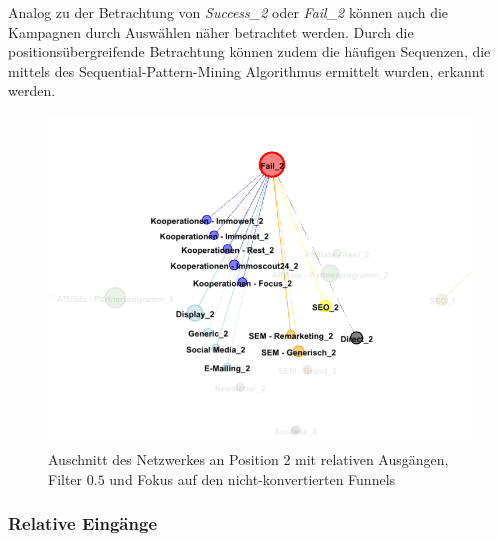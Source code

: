 Analog zu der Betrachtung von \textit{Success\_2} oder \textit{Fail\_2} können auch die Kampagnen durch Auswählen näher betrachtet werden. Durch die positionsübergreifende Betrachtung können zudem die häufigen Sequenzen, die mittels des Sequential-Pattern-Mining Algorithmus ermittelt wurden, erkannt werden.
\begin{figure}[H]
	\centering\includegraphics[scale=0.35]{out_filter_50_fail.png}\caption[Relative Ausgänge mit Filter $0.5$]{Auschnitt des Netzwerkes an Position $2$ mit relativen Ausgängen, Filter $0.5$ und Fokus auf den nicht-konvertierten Funnels}\label{out_filter_50_fail}
\end{figure}

\subsubsection*{Relative Eingänge}

